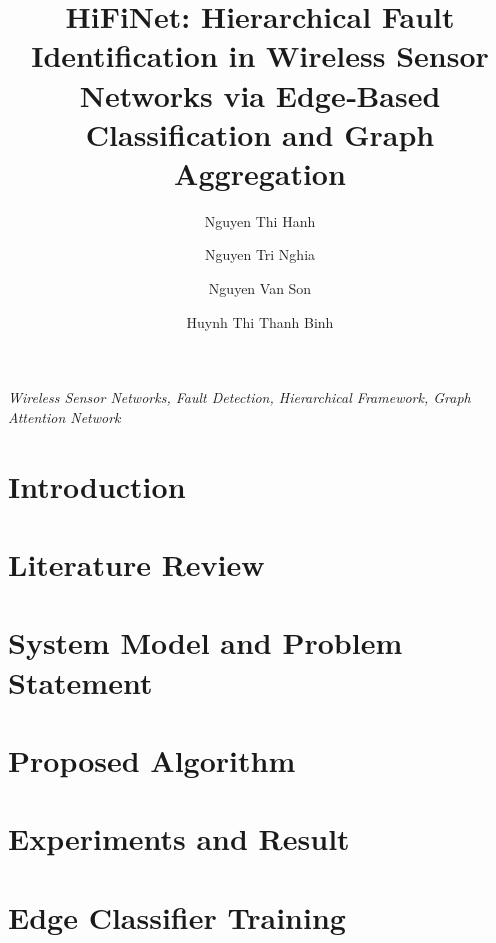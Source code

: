 \documentclass[preprint,12pt]{elsarticle}
\begin{document}
\begin{frontmatter}

\title{HiFiNet: Hierarchical Fault Identification in Wireless Sensor Networks via Edge‑Based Classification and Graph Aggregation}

\author[fidt:pnk]{Nguyen Thi Hanh}
\author[hust]{Nguyen Tri Nghia}
\author[fcs:pnk]{Nguyen Van Son}
\author[hust]{Huynh Thi Thanh Binh}
\address[fidt:pnk]{Faculty of Interdisciplinary Digital Technology (FIDT), PHENIKAA University, Vietnam}
\address[hust]{Hanoi University of Science and Technology, Vietnam}
\address[fcs:pnk]{Faculty of Computer Science, PHENIKAA University, Yen Nghia, Ha Dong, Hanoi 12116, Vietnam}



\begin{keyword}
\textit{Wireless Sensor Networks, Fault Detection, Hierarchical Framework, Graph Attention Network}
\end{keyword}

\end{frontmatter}

\section{Introduction}


\section{Literature Review}


\section{System Model and Problem Statement}


\section{Proposed Algorithm}
\label{sec:method}


\section{Experiments and Result}


\clearpage


\clearpage
\appendix
\section{Edge Classifier Training}
\label{app:edge_training}

\end{document}
